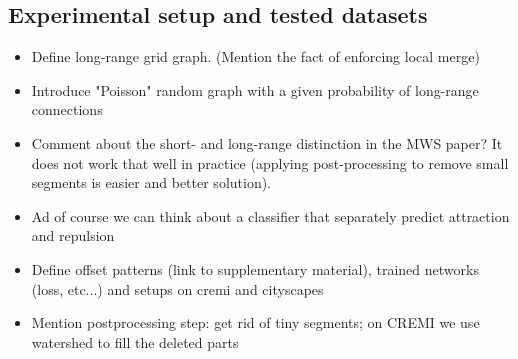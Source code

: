 
\subsection{Experimental setup and tested datasets}
\begin{itemize}
    \item Define long-range grid graph. (Mention the fact of enforcing local merge)
\item Introduce "Poisson" random graph with a given probability of long-range connections
\item Comment about the short- and long-range distinction in the MWS paper? It does not work that well in practice (applying post-processing to remove small segments is easier and better solution).
\item Ad of course we can think about a classifier that separately predict attraction and repulsion
\item Define offset patterns (link to supplementary material), trained networks (loss, etc...) and setups on cremi and cityscapes 
\item Mention postprocessing step: get rid of tiny segments; on CREMI we use watershed to fill the deleted parts 
\end{itemize}
